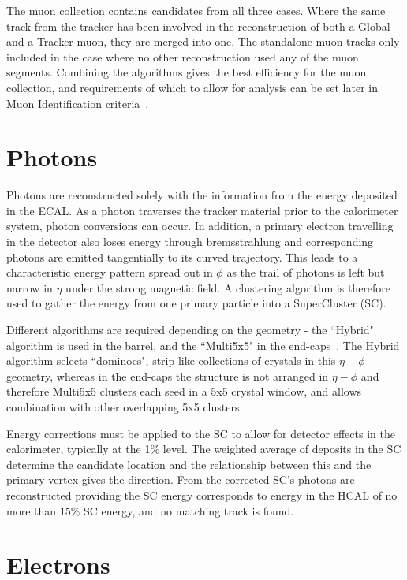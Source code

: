 The muon collection contains candidates from all three cases. Where the same track from the tracker has been involved in the reconstruction of both a Global and a Tracker muon, they are merged into one.  The standalone muon tracks only included in the case where no other reconstruction used any of the muon segments. Combining the algorithms gives the best efficiency for the muon collection, and requirements of which to allow for analysis can be set later in Muon Identification criteria~\cite{MUO-10-002}. 
\section{Photons}

Photons are reconstructed solely with the information from the energy deposited in the ECAL. As a photon traverses the tracker material prior to the calorimeter system, photon conversions can occur.  In addition, a primary electron travelling in the detector also loses energy through bremsstrahlung and corresponding photons are emitted tangentially to its curved trajectory. This leads to a characteristic energy pattern spread out in $\phi$ as the trail of photons is left but narrow in $\eta$ under the strong magnetic field. A clustering algorithm is therefore used to gather the energy from one primary particle into a SuperCluster (SC).

 Different algorithms are required depending on the geometry - the ``Hybrid" algorithm is used in the barrel, and the ``Multi5x5" in the end-caps~\cite{EGM-10-005}. The Hybrid algorithm selects ``dominoes", strip-like collections of crystals in this $\eta - \phi$ geometry, whereas in the end-caps the structure is not arranged in $\eta - \phi$ and therefore Multi5x5 clusters each seed in a 5x5 crystal window, and allows combination with other overlapping 5x5 clusters.

Energy corrections must be applied to the SC to allow for detector effects in the calorimeter, typically at the 1\% level. The weighted average of deposits in the SC determine the candidate location and the relationship between this and the primary vertex gives the direction. From the corrected SC's photons are reconstructed providing the SC energy corresponds to energy in the HCAL of no more than 15\% SC energy, and no matching track is found. 

\section{Electrons}

